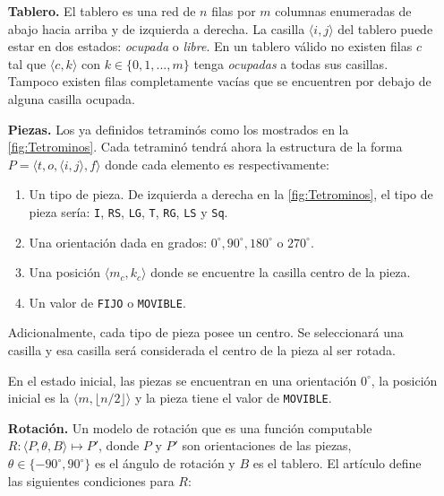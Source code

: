 \begin{itemize}[leftmargin=0.5cm,align=left]
\item[\textbf{Tablero. }] El tablero es una red de $n$ filas por $m$ columnas
enumeradas de abajo hacia arriba y de izquierda a derecha. La casilla
$\langle i, j \rangle$ del tablero puede estar en dos estados: \textit{ocupada} o
\textit{libre}. En un tablero válido no existen filas $c$ tal que
$\langle c,k \rangle$ con $k\in \{0,1,...,m\}$ tenga
\textit{ocupadas} a todas sus casillas. Tampoco existen filas completamente vacías que se
encuentren por debajo de alguna casilla ocupada.

\item[\textbf{Piezas. }] Los ya definidos tetraminós como los mostrados en
la \cref{fig:Tetrominos}. Cada tetraminó tendrá ahora la estructura de la
forma $P = \langle t, o, \langle i,j \rangle, f \rangle$ donde cada elemento es
respectivamente:

\begin{enumerate}
        \item Un tipo de pieza. De izquierda a derecha en la  
        \cref{fig:Tetrominos}, el tipo de pieza sería:
        \texttt{I}, \texttt{RS}, \texttt{LG}, \texttt{T},
        \texttt{RG}, \texttt{LS} y \texttt{Sq}.

        \item Una orientación dada en grados: $0^{\circ}, 90^{\circ}, 180^{\circ}$ o $270^{\circ}$.

        \item Una posición $\langle m_{c},k_{c} \rangle$ donde se encuentre la casilla
        centro de la pieza.

        \item Un valor de \texttt{FIJO} o \texttt{MOVIBLE}.
\end{enumerate}

Adicionalmente, cada tipo de pieza posee un centro. Se seleccionará una
casilla y esa casilla será considerada el centro de la pieza al ser rotada.

En el estado inicial, las piezas se encuentran en una orientación $0^{\circ}$,
la posición inicial es la $\langle m ,\lfloor n/2 \rfloor \rangle$ y la pieza tiene
el valor de \texttt{MOVIBLE}.

\item[\textbf{Rotación. }] Un modelo de rotación que es una función computable
$R: \langle P, \theta, B \rangle \mapsto P'$, donde $P$ y $P'$ son orientaciones
de las piezas, $\theta \in \{-90^{\circ}, 90^{\circ}\}$ es el ángulo de
rotación y $B$ es el tablero. El artículo define las siguientes
condiciones para $R$:


\end{itemize}
